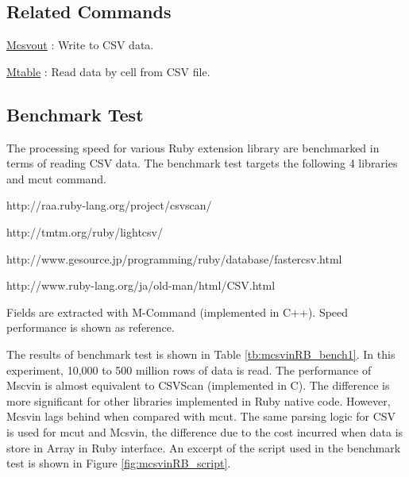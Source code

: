 \subsection*{Related Commands}
\hyperref[sect:mcsvoutRB]{Mcsvout} : Write to CSV data. 

\hyperref[sect:mtableRB]{Mtable} : Read data by cell from CSV file.

\subsection{Benchmark Test}

The processing speed for various Ruby extension library are benchmarked in terms of reading CSV data. 
The benchmark test targets the following 4 libraries and mcut command. 

\begin{description}
\setlength{\itemindent}{0mm}
\item[CSVScan] http://raa.ruby-lang.org/project/csvscan/
\item[LightCsv] http://tmtm.org/ruby/lightcsv/
\item[FasterCSV] http://www.gesource.jp/programming/ruby/database/fastercsv.html
\item[CSV] http://www.ruby-lang.org/ja/old-man/html/CSV.html
\item[mcut] Fields are extracted with M-Command (implemented in C++). Speed performance is shown as reference. 
\end{description}

The results of benchmark test is shown in Table \ref{tb:mcsvinRB_bench1}. In this experiment, 10,000 to 500 million rows of data is read. The performance of Mscvin is almost equivalent to CSVScan (implemented in C). The difference is more significant for other libraries implemented in Ruby native code. However, Mcsvin lags behind when compared with mcut. The same parsing logic for CSV is used for mcut and Mcsvin, the difference due to the cost incurred when data is store in Array in Ruby interface. An excerpt of the script used in the benchmark test is shown in Figure \ref{fig:mcsvinRB_script}. 


